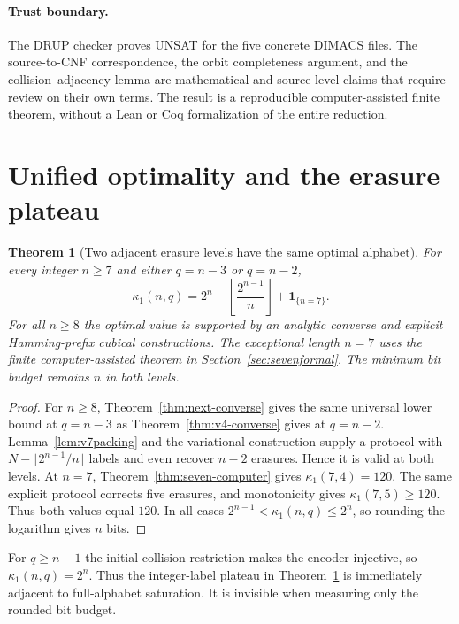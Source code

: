 \documentclass[11pt,a4paper]{article}
\newtheorem{theorem}{Theorem}[section]
\begin{document}
\paragraph{Trust boundary.} The DRUP checker proves UNSAT for the five concrete DIMACS files. The source-to-CNF correspondence, the orbit completeness argument, and the collision--adjacency lemma are mathematical and source-level claims that require review on their own terms. The result is a reproducible computer-assisted finite theorem, without a Lean or Coq formalization of the entire reduction.



\section{Unified optimality and the erasure plateau}\label{sec:unified}
\begin{theorem}[Two adjacent erasure levels have the same optimal alphabet]\label{thm:plateau}
For every integer $n\ge7$ and either $q=n-3$ or $q=n-2$,
\begin{equation}\label{eq:plateau}
\boxed{\quad
\kappa_1(n,q)=2^n-\left\lfloor\frac{2^{n-1}}n\right\rfloor+\mathbf1_{\{n=7\}}.
\quad}
\end{equation}
For all $n\ge8$ the optimal value is supported by an analytic converse and explicit Hamming-prefix cubical constructions. The exceptional length $n=7$ uses the finite computer-assisted theorem in Section~\ref{sec:sevenformal}. The minimum bit budget remains $n$ in both levels.
\end{theorem}
\begin{proof}
For $n\ge8$, Theorem~\ref{thm:next-converse} gives the same universal lower bound at $q=n-3$ as Theorem~\ref{thm:v4-converse} gives at $q=n-2$. Lemma~\ref{lem:v7packing} and the variational construction supply a protocol with $N-\lfloor2^{n-1}/n\rfloor$ labels and even recover $n-2$ erasures. Hence it is valid at both levels. At $n=7$, Theorem~\ref{thm:seven-computer} gives $\kappa_1(7,4)=120$. The same explicit protocol corrects five erasures, and monotonicity gives $\kappa_1(7,5)\ge120$. Thus both values equal $120$. In all cases $2^{n-1}<\kappa_1(n,q)\le2^n$, so rounding the logarithm gives $n$ bits.
\end{proof}

For $q\ge n-1$ the initial collision restriction makes the encoder injective, so $\kappa_1(n,q)=2^n$. Thus the integer-label plateau in Theorem~\ref{thm:plateau} is immediately adjacent to full-alphabet saturation. It is invisible when measuring only the rounded bit budget.
\end{document}
